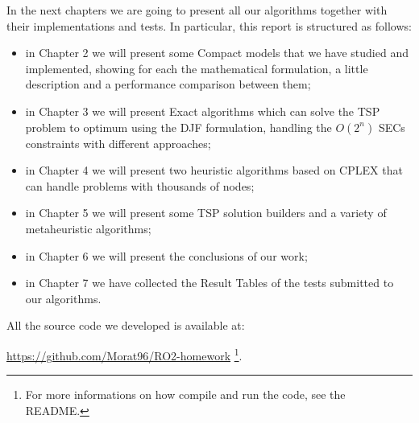 \noindent 
In the next chapters we are going to present all our algorithms together with their implementations and tests. In particular, this report is structured as follows:

\begin{itemize}
  \item in Chapter 2 we will present some Compact models that we have studied and implemented, showing for each the mathematical formulation, a little description and a performance comparison between them;
  \item in Chapter 3 we will present Exact algorithms which can solve the TSP problem to optimum using the DJF formulation, handling the $O(2^n)$ SECs constraints with different approaches;
    \item in Chapter 4 we will present two heuristic algorithms based on CPLEX that can handle problems with thousands of nodes;
    \item in Chapter 5 we will present some TSP solution builders and a variety of metaheuristic algorithms;
     \item in Chapter 6 we will present the conclusions of our work;
     \item in Chapter 7 we have collected the Result Tables of the tests submitted to our algorithms.
\end{itemize}

All the source code we developed is available at:
\begin{center}
\url{https://github.com/Morat96/RO2-homework} \footnote{For more informations on how compile and run the code, see the README.}. 

\end{center}

